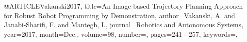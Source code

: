 @ARTICLE{Vakanski2017,
title={An Image-based Trajectory Planning Approach for Robust Robot Programming by Demonstration},
author={Vakanski, A. and Janabi-Sharifi, F. and Mantegh, I.},
journal={Robotics and Autonomous Systems}, 
year={2017},
month={Dec.},
volume={98},
number={},
pages={241 - 257},
keywords={},
}
